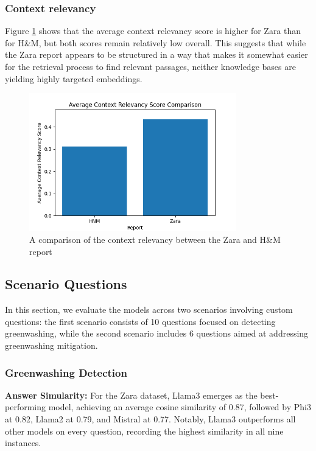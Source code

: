 \documentclass[]{article}
\begin{document}
\subsubsection{Context relevancy}
Figure \ref{fig:con_rel} shows that the average context relevancy score is higher for Zara than for H\&M, but both scores remain relatively low overall. This suggests that while the Zara report appears to be structured in a way that makes it somewhat easier for the retrieval process to find relevant passages, neither knowledge bases are yielding highly targeted embeddings.
\begin{figure}[H]
    \centering
    \includegraphics[width=0.8\textwidth]{./images/context_relevancy_comp.png}
    \caption{A comparison of the context relevancy between the Zara and H\&M report}
    \label{fig:con_rel}
\end{figure}
\subsection{Scenario Questions}
In this section, we evaluate the models across two scenarios involving custom questions: 
the first scenario consists of 10 questions focused on detecting greenwashing, 
while the second scenario includes 6 questions aimed at addressing greenwashing mitigation.

\subsubsection{Greenwashing Detection}
\textbf{Answer Simularity:} 
For the Zara dataset, Llama3 emerges as the best-performing model, achieving an average cosine similarity of 0.87, followed by Phi3 at 0.82, Llama2 at 0.79, and Mistral at 0.77. Notably, Llama3 outperforms all other models on every question, recording the highest similarity in all nine instances.
\end{document}
